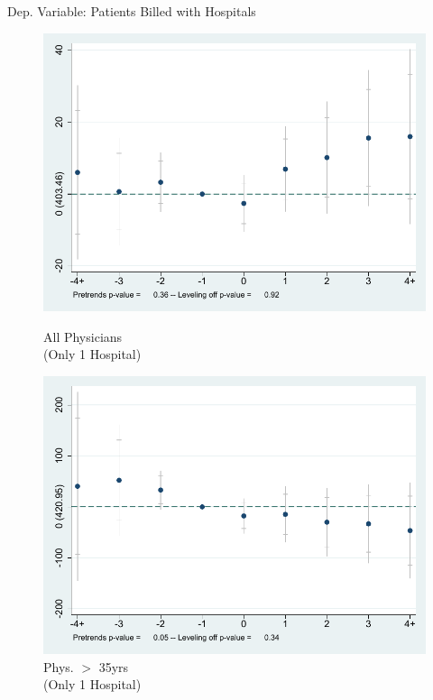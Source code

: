 \documentclass[10pt]{beamer}
\begin{document}
\begin{frame}{Dep. Variable: Patients Billed with Hospitals}
\begin{figure}[ht]
        \begin{minipage}[b]{0.47\linewidth}
            \centering
            \includegraphics[width=\textwidth]{Objects/xtevent_hosp_fullsample.pdf}
            \caption{\small All Physicians \\(Only 1 Hospital)}
        \end{minipage}
        \hspace{0.2cm}
        \begin{minipage}[b]{0.47\linewidth}
            \centering
            \includegraphics[width=\textwidth]{Objects/xtevent_hosp_oldsample.pdf}
            \caption{\small Phys. $>$ 35yrs\\ (Only 1 Hospital)}
        \end{minipage}
    \end{figure}
\end{frame}
\end{document}
